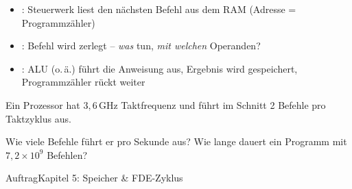 \begin{frame}
\begin{itemize}[<+->]\setlength\itemsep{6pt}
  \item {}: Steuerwerk liest den nächsten Befehl aus dem RAM (Adresse = Programmzähler)
  \item {}: Befehl wird zerlegt -- \emph{was} tun, \emph{mit welchen} Operanden?
  \item {}: ALU (o.\,ä.) führt die Anweisung aus, Ergebnis wird gespeichert, Programmzähler rückt weiter
\end{itemize}
\end{frame}

\begin{frame}
\begin{center}
Ein Prozessor hat $3{,}6\,\mathrm{GHz}$ Taktfrequenz und führt im Schnitt 2 Befehle pro Taktzyklus aus.
\vspace{3mm}

Wie viele Befehle führt er pro Sekunde aus? Wie lange dauert ein Programm mit $7{,}2\times 10^9$ Befehlen?
\end{center}
\end{frame}

\begin{frame}{Auftrag}{Kapitel 5: Speicher \& FDE-Zyklus}
\\[3mm]
\\[3mm]
\end{frame}
